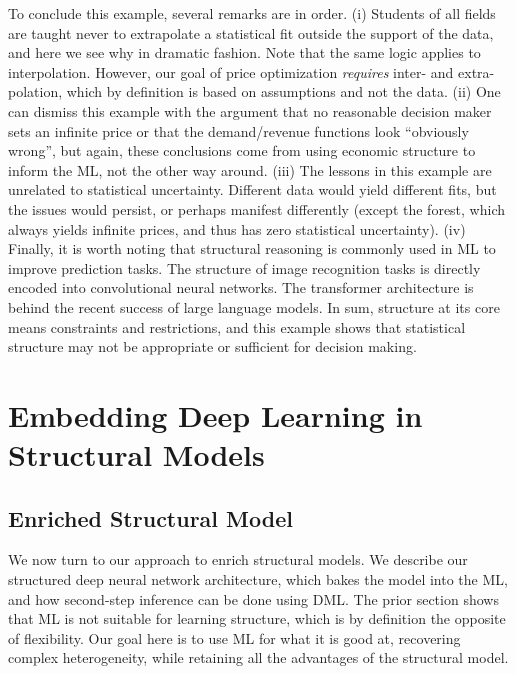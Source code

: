 \documentclass[12pt]{article}
\numberwithin{equation}{section}
\theoremstyle{definition}
\begin{document}
To conclude this example, several remarks are in order. (i) Students of all fields are taught never to extrapolate a statistical fit outside the support of the data, and here we see why in dramatic fashion. Note that the same logic applies to interpolation. However, our goal of price optimization \emph{requires} inter- and extra-polation, which by definition is based on assumptions and not the data. (ii) One can dismiss this example with the argument that no reasonable decision maker sets an infinite price or that the demand/revenue functions look ``obviously wrong'', but again, these conclusions come from using economic structure to inform the ML, not the other way around. (iii) The lessons in this example are unrelated to statistical uncertainty. Different data would yield different fits, but the issues would persist, or perhaps manifest differently (except the forest, which always yields infinite prices, and thus has zero statistical uncertainty). (iv) Finally, it is worth noting that structural reasoning is commonly used in ML to improve prediction tasks. The structure of image recognition tasks is directly encoded into convolutional neural networks. The transformer architecture is behind the recent success of large language models. In sum, structure at its core means constraints and restrictions, and this example shows that statistical structure may not be appropriate or sufficient for decision making. 


\section{Embedding Deep Learning in Structural Models}
	\label{sec:framework}





\subsection{Enriched Structural Model}
	\label{sec:model}

    
We now turn to our approach to enrich structural models. We describe our structured deep neural network architecture, which bakes the model into the ML, and how second-step inference can be done using DML. The prior section shows that ML is not suitable for learning structure, which is by definition the opposite of flexibility. Our goal here is to use ML for what it is good at, recovering complex heterogeneity, while retaining all the advantages of the structural model. 
\end{document}
